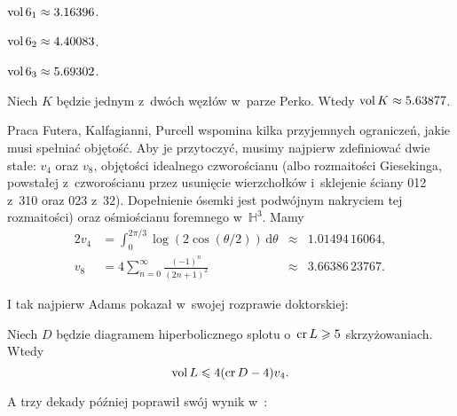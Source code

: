\begin{example}
    $\operatorname{vol} 6_1 \approx 3.16396$.
\end{example}

\begin{example}
    $\operatorname{vol} 6_2 \approx 4.40083$.
\end{example}

\begin{example}
    $\operatorname{vol} 6_3 \approx 5.69302$.
\end{example}

\begin{example}
%
    Niech $K$ będzie jednym z~dwóch węzłów w~parze Perko.
    Wtedy $\operatorname{vol} K \approx 5.63877$.
\end{example}

Praca Futera, Kalfagianni, Purcell \cite{purcell2019} wspomina kilka przyjemnych ograniczeń, jakie musi spełniać objętość.
%
%
%
Aby je przytoczyć, musimy najpierw zdefiniować dwie stałe: $v_4$ oraz $v_8$, objętości idealnego czworościanu (albo rozmaitości Giesekinga, powstałej z~czworościanu przez usunięcie  wierzchołków i~sklejenie ściany 012 z~310 oraz 023 z~32).
 Dopełnienie ósemki jest podwójnym nakryciem tej rozmaitości) oraz ośmiościanu foremnego w~$\mathbb H^3$.
%
Mamy
\begin{alignat}{2}
    v_4 & = \int_{0}^{2\pi/3} \log(2 \cos(\theta/2)) \,\mathrm{d}\theta & {}\approx{} & 1.01494\,16064, \\
    v_8 & = 4 \sum_{n=0}^\infty \frac{(-1)^n}{(2n+1)^2} &{}\approx{}& 3.66386\,23767.
\end{alignat}

I tak najpierw Adams \cite{adams1983} pokazał w~swojej rozprawie doktorskiej:
%

\begin{proposition}
    Niech $D$ będzie diagramem hiperbolicznego splotu o~$\operatorname{cr} L \geqslant 5$ skrzyżowaniach.
    Wtedy
    \begin{equation}
        \operatorname{vol} L \leqslant 4 (\operatorname{cr} D - 4) v_4.
    \end{equation}
\end{proposition}

A trzy dekady później poprawił swój wynik w~\cite{adams2013}:

